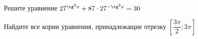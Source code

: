 \begin{ex}
	\begin{condition}
		\begin{enumcols}[label=\asbuk*)]
			\item Решите уравнение \( 27^{\tg^2 x} + 87\cdot27^{-\tg^2 x} =30 \)
			\item Найдите все корни уравнения, принадлежащие отрезку \(  \left[\dfrac{3\pi}{2};3\pi\right] \)
		\end{enumcols}
	\end{condition}
\end{ex}